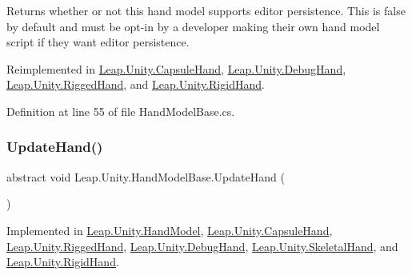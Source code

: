 Returns whether or not this hand model supports editor persistence. This is false by default and must be opt-\/in by a developer making their own hand model script if they want editor persistence. 



Reimplemented in \mbox{\hyperlink{class_leap_1_1_unity_1_1_capsule_hand_ae914f49384f678f6613cd95f71eae24f}{Leap.\+Unity.\+Capsule\+Hand}}, \mbox{\hyperlink{class_leap_1_1_unity_1_1_debug_hand_ab2f2c81a42220b3b96cbdabadbfefd17}{Leap.\+Unity.\+Debug\+Hand}}, \mbox{\hyperlink{class_leap_1_1_unity_1_1_rigged_hand_aa44bd1ae715125809d5803b293eb1bee}{Leap.\+Unity.\+Rigged\+Hand}}, and \mbox{\hyperlink{class_leap_1_1_unity_1_1_rigid_hand_ae917a680f49c928d78c59a842798d7ae}{Leap.\+Unity.\+Rigid\+Hand}}.



Definition at line 55 of file Hand\+Model\+Base.\+cs.

\mbox{\label{class_leap_1_1_unity_1_1_hand_model_base_ae80b6c96322d078f01aacc02639d9dd0}} 
\subsubsection{\texorpdfstring{UpdateHand()}{UpdateHand()}}
{\footnotesize\ttfamily abstract void Leap.\+Unity.\+Hand\+Model\+Base.\+Update\+Hand (\begin{DoxyParamCaption}{ }\end{DoxyParamCaption})\hspace{0.3cm}{\ttfamily [pure virtual]}}



Implemented in \mbox{\hyperlink{class_leap_1_1_unity_1_1_hand_model_acbb96fd18f28d01a74c1e0ac709b1977}{Leap.\+Unity.\+Hand\+Model}}, \mbox{\hyperlink{class_leap_1_1_unity_1_1_capsule_hand_a4a90f86a17e589ea462e29d99a2a51f9}{Leap.\+Unity.\+Capsule\+Hand}}, \mbox{\hyperlink{class_leap_1_1_unity_1_1_rigged_hand_ac4e41fd3965e2d0d56379d3fc6011128}{Leap.\+Unity.\+Rigged\+Hand}}, \mbox{\hyperlink{class_leap_1_1_unity_1_1_debug_hand_a72947d57d9e6eaabade4aa289d5052bd}{Leap.\+Unity.\+Debug\+Hand}}, \mbox{\hyperlink{class_leap_1_1_unity_1_1_skeletal_hand_afe381218670f759392ccbb420dae78f4}{Leap.\+Unity.\+Skeletal\+Hand}}, and \mbox{\hyperlink{class_leap_1_1_unity_1_1_rigid_hand_a335a489bb61e5d3a95119ffdda8794b1}{Leap.\+Unity.\+Rigid\+Hand}}.



